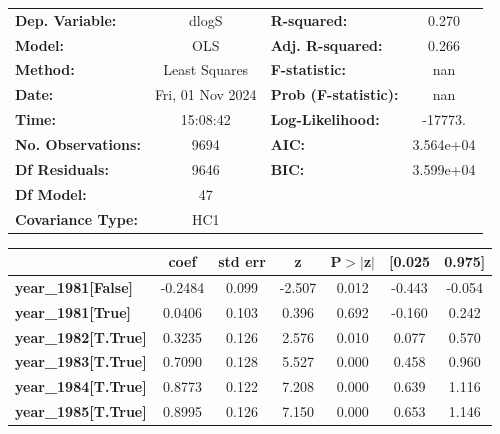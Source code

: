 \begin{center}
\begin{tabular}{lclc}
\toprule
\textbf{Dep. Variable:}     &      dlogS       & \textbf{  R-squared:         } &     0.270   \\
\textbf{Model:}             &       OLS        & \textbf{  Adj. R-squared:    } &     0.266   \\
\textbf{Method:}            &  Least Squares   & \textbf{  F-statistic:       } &       nan   \\
\textbf{Date:}              & Fri, 01 Nov 2024 & \textbf{  Prob (F-statistic):} &      nan    \\
\textbf{Time:}              &     15:08:42     & \textbf{  Log-Likelihood:    } &   -17773.   \\
\textbf{No. Observations:}  &        9694      & \textbf{  AIC:               } & 3.564e+04   \\
\textbf{Df Residuals:}      &        9646      & \textbf{  BIC:               } & 3.599e+04   \\
\textbf{Df Model:}          &          47      & \textbf{                     } &             \\
\textbf{Covariance Type:}   &       HC1        & \textbf{                     } &             \\
\bottomrule
\end{tabular}
\begin{tabular}{lcccccc}
                            & \textbf{coef} & \textbf{std err} & \textbf{z} & \textbf{P$> |$z$|$} & \textbf{[0.025} & \textbf{0.975]}  \\
\midrule
\textbf{year\_1981[False]}  &      -0.2484  &        0.099     &    -2.507  &         0.012        &       -0.443    &       -0.054     \\
\textbf{year\_1981[True]}   &       0.0406  &        0.103     &     0.396  &         0.692        &       -0.160    &        0.242     \\
\textbf{year\_1982[T.True]} &       0.3235  &        0.126     &     2.576  &         0.010        &        0.077    &        0.570     \\
\textbf{year\_1983[T.True]} &       0.7090  &        0.128     &     5.527  &         0.000        &        0.458    &        0.960     \\
\textbf{year\_1984[T.True]} &       0.8773  &        0.122     &     7.208  &         0.000        &        0.639    &        1.116     \\
\textbf{year\_1985[T.True]} &       0.8995  &        0.126     &     7.150  &         0.000        &        0.653    &        1.146     \\

\end{tabular}
\end{center}
